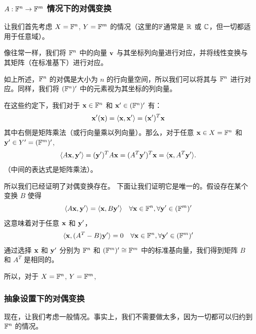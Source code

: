 \subsubsection{\texorpdfstring{$A : \mathbb{F}^n \to \mathbb{F}^m$ 情况下的对偶变换}{A 从 F^n 到 F^m 情况下的对偶变换}}\label{sec:08-03-01-01}

让我们首先考虑 $X = \mathbb{F}^n$, $Y = \mathbb{F}^m$ 的情况（这里的$\mathbb{F}$通常是 $\mathbb{R}$ 或 $\mathbb{C}$，但一切都适用于任意域）。

像往常一样，我们将 $\mathbb{F}^n$ 中的向量 $\mathbf{v}$ 与其坐标列向量进行对应，并将线性变换与其矩阵（在标准基下）进行对应。

如上所述，$\mathbb{F}^n$ 的对偶是大小为 $n$ 的行向量空间，所以我们可以将其与 $\mathbb{F}^n$ 进行对应。同样，我们将 $(\mathbb{F}^n)'$ 中的元素视为其坐标的列向量。

在这些约定下，我们对于 $\mathbf{x} \in \mathbb{F}^n$ 和 $\mathbf{x}' \in (\mathbb{F}^n)'$ 有：
$$ \mathbf{x}'(\mathbf{x}) = \langle \mathbf{x}, \mathbf{x}' \rangle = (\mathbf{x}')^T \mathbf{x} $$
其中右侧是矩阵乘法（或行向量乘以列向量）。那么，对于任意 $\mathbf{x} \in X = \mathbb{F}^n$ 和 $\mathbf{y}' \in Y' = (\mathbb{F}^m)'$,
$$ \langle A\mathbf{x}, \mathbf{y}' \rangle = (\mathbf{y}')^T A\mathbf{x} = (A^T \mathbf{y}')^T \mathbf{x} = \langle \mathbf{x}, A^T \mathbf{y}' \rangle. $$
（中间的表达式是矩阵乘法）。

所以我们已经证明了对偶变换存在。
下面让我们证明它是唯一的。假设存在某个变换 $B$ 使得
$$ \langle A\mathbf{x}, \mathbf{y}' \rangle = \langle \mathbf{x}, B\mathbf{y}' \rangle \quad \forall \mathbf{x} \in \mathbb{F}^n, \forall \mathbf{y}' \in (\mathbb{F}^m)' $$
这意味着对于任意 $\mathbf{x}$ 和 $\mathbf{y}'$，
$$ \langle \mathbf{x}, (A^T - B)\mathbf{y}' \rangle = 0 \quad \forall \mathbf{x} \in \mathbb{F}^n, \forall \mathbf{y}' \in (\mathbb{F}^m)'$$
通过选择 $\mathbf{x}$ 和 $\mathbf{y}'$ 分别为 $\mathbb{F}^n$ 和 $(\mathbb{F}^m)' \cong \mathbb{F}^m$ 中的标准基向量，我们得到矩阵 $B$ 和 $A^T$ 是相同的。

所以，对于 $X = \mathbb{F}^n$, $Y = \mathbb{F}^m$,



\subsubsection{抽象设置下的对偶变换}\label{sec:08-03-01-02}

现在，让我们考虑一般情况。事实上，我们不需要做太多，因为一切都可以归约到 $\mathbb{F}^n$ 的情况。

